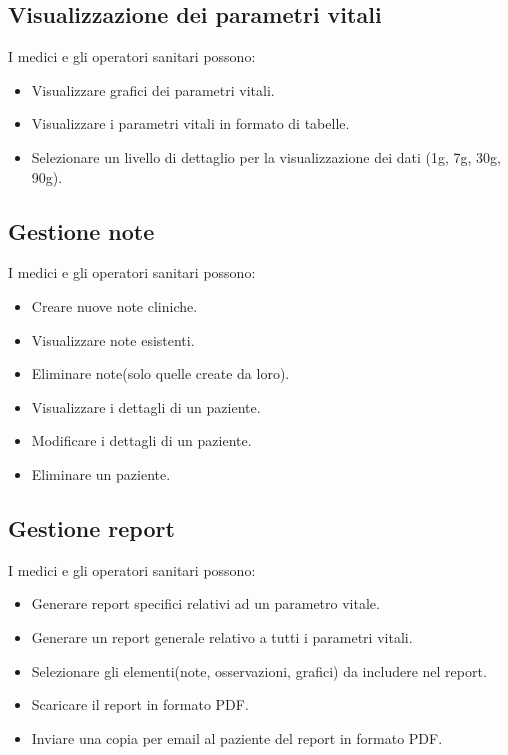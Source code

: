 \documentclass[12pt,a4paper,oneside]{report}
\begin{document}
\subsection{Visualizzazione dei parametri vitali}
I medici e gli operatori sanitari possono:
\begin{itemize}
    \item Visualizzare grafici dei parametri vitali.
    \item Visualizzare i parametri vitali in formato di tabelle.
    \item Selezionare un livello di dettaglio per la visualizzazione dei dati (1g, 7g, 30g, 90g).
\end{itemize}
\subsection{Gestione note}
I medici e gli operatori sanitari possono:
\begin{itemize}
    \item Creare nuove note cliniche.
    \item Visualizzare note esistenti.
    \item Eliminare note(solo quelle create da loro).
    \item Visualizzare i dettagli di un paziente.
    \item Modificare i dettagli di un paziente.
    \item Eliminare un paziente.
\end{itemize}
\subsection{Gestione report}
I medici e gli operatori sanitari possono:
\begin{itemize}
    \item Generare report specifici relativi ad un parametro vitale.
    \item Generare un report generale relativo a tutti i parametri vitali.
    \item Selezionare gli elementi(note, osservazioni, grafici) da includere nel report.
    \item Scaricare il report in formato PDF.
    \item Inviare una copia per email al paziente del report in formato PDF.
\end{itemize}
\end{document}
